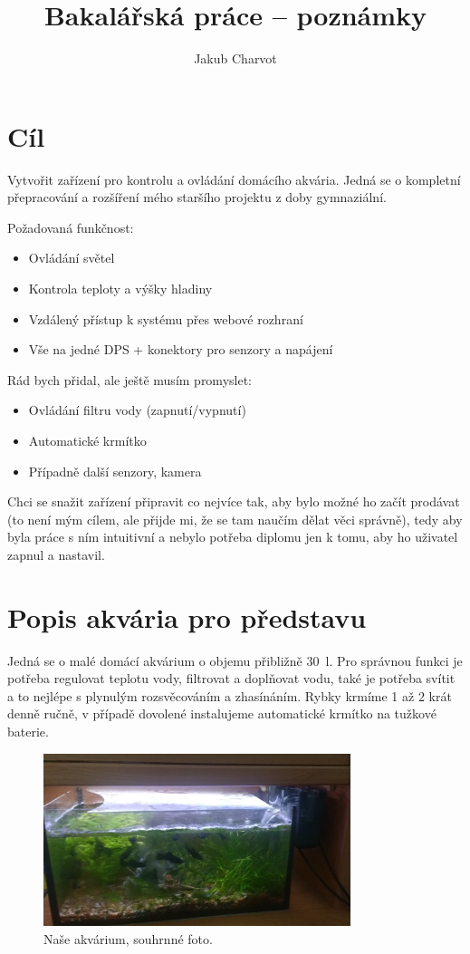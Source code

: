\documentclass{customarticle}
\author{Jakub Charvot}
\title{Bakalářská práce -- poznámky}
\begin{document}
	\maketitle

\section*{Cíl}
	Vytvořit zařízení pro kontrolu a ovládání domácího akvária. Jedná se o kompletní přepracování a rozšíření mého staršího projektu z doby gymnaziální.
	
	Požadovaná funkčnost:
	\begin{itemize}
		\item Ovládání světel
		\item Kontrola teploty a výšky hladiny
		\item Vzdálený přístup k systému přes webové rozhraní
		\item Vše na jedné DPS + konektory pro senzory a napájení
	\end{itemize}

	Rád bych přidal, ale ještě musím promyslet:
	\begin{itemize}
		\item Ovládání filtru vody (zapnutí/vypnutí)
		\item Automatické krmítko
		\item Případně další senzory, kamera
	\end{itemize}

	Chci se snažit zařízení připravit co nejvíce tak, aby bylo možné ho začít prodávat (to není mým cílem, ale přijde mi, že se tam naučím dělat věci správně), tedy aby byla práce s ním intuitivní a nebylo potřeba diplomu jen k tomu, aby ho uživatel zapnul a nastavil.

\clearpage
\section*{Popis akvária pro představu}
	Jedná se o malé domácí akvárium o objemu přibližně \qty{30}{\litre}. Pro správnou funkci je potřeba regulovat teplotu vody, filtrovat a doplňovat vodu, také je potřeba svítit a to nejlépe s plynulým rozsvěcováním a zhasínáním. Rybky krmíme 1 až 2 krát denně ručně, v případě dovolené instalujeme automatické krmítko na tužkové baterie.
	\begin{figure}[!h]
		\centering
		\includegraphics[width=0.8\textwidth]{akvarko.jpg}
		\caption{Naše akvárium, souhrnné foto.}
		\label{fig:akvarko}
	\end{figure}
\end{document}
